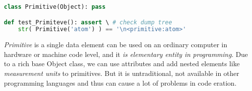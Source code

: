 \clearpage{}\secdown

\begin{lstlisting}[language=Python]
class Primitive(Object): pass

def test_Primiteve(): assert \ # check dump tree
	str( Primitive('atom') ) == '\n<primitive:atom>'
\end{lstlisting}

\noindent
\emph{Primitive} is a single data element can be used on an ordinary computer in
hardware or machine code level, and it \emph{is elementary entity in
programming}. Due to a rich base Object class, we can use attributes and add
nested elements like \emph{measurement units} to primitives. But it is
untraditional, not available in other programming languages and thus can cause a
lot of problems in code eration.






\secup